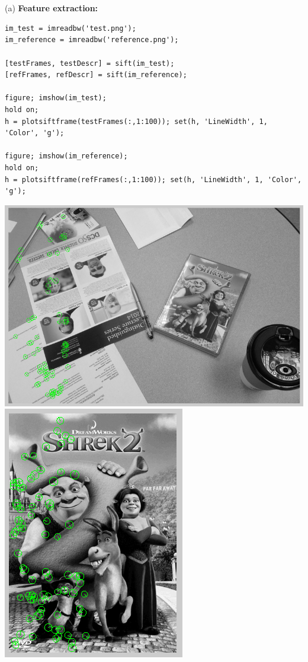 \documentclass[11pt]{article}
\begin{document}
\section{}
(a) \textbf{Feature extraction:}
\begin{lstlisting}
im_test = imreadbw('test.png');
im_reference = imreadbw('reference.png');

[testFrames, testDescr] = sift(im_test);
[refFrames, refDescr] = sift(im_reference);

figure; imshow(im_test);
hold on;
h = plotsiftframe(testFrames(:,1:100)); set(h, 'LineWidth', 1, 'Color', 'g');

figure; imshow(im_reference);
hold on;
h = plotsiftframe(refFrames(:,1:100)); set(h, 'LineWidth', 1, 'Color', 'g');
\end{lstlisting}
\includegraphics[scale=0.5]{refsiftframe}
\\
\includegraphics[scale=0.5]{testsiftframe}
\end{document}
